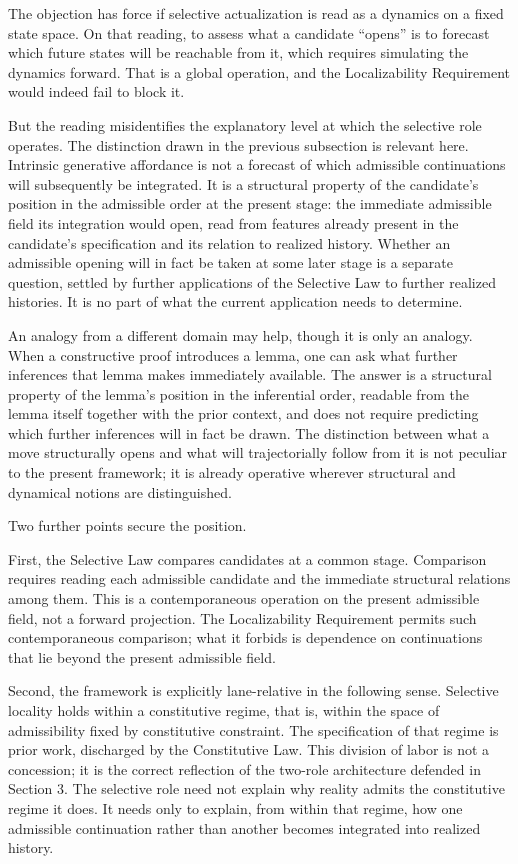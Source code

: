 \documentclass[11pt]{article}
\theoremstyle{foundation}
\begin{document}
The objection has force if selective actualization is read as a dynamics on a fixed state space. On that reading, to assess what a candidate ``opens'' is to forecast which future states will be reachable from it, which requires simulating the dynamics forward. That is a global operation, and the Localizability Requirement would indeed fail to block it.

But the reading misidentifies the explanatory level at which the selective role operates. The distinction drawn in the previous subsection is relevant here. Intrinsic generative affordance is not a forecast of which admissible continuations will subsequently be integrated. It is a structural property of the candidate's position in the admissible order at the present stage: the immediate admissible field its integration would open, read from features already present in the candidate's specification and its relation to realized history. Whether an admissible opening will in fact be taken at some later stage is a separate question, settled by further applications of the Selective Law to further realized histories. It is no part of what the current application needs to determine.

An analogy from a different domain may help, though it is only an analogy. When a constructive proof introduces a lemma, one can ask what further inferences that lemma makes immediately available. The answer is a structural property of the lemma's position in the inferential order, readable from the lemma itself together with the prior context, and does not require predicting which further inferences will in fact be drawn. The distinction between what a move structurally opens and what will trajectorially follow from it is not peculiar to the present framework; it is already operative wherever structural and dynamical notions are distinguished.

Two further points secure the position.

First, the Selective Law compares candidates at a common stage. Comparison requires reading each admissible candidate and the immediate structural relations among them. This is a contemporaneous operation on the present admissible field, not a forward projection. The Localizability Requirement permits such contemporaneous comparison; what it forbids is dependence on continuations that lie beyond the present admissible field.

Second, the framework is explicitly lane-relative in the following sense. Selective locality holds within a constitutive regime, that is, within the space of admissibility fixed by constitutive constraint. The specification of that regime is prior work, discharged by the Constitutive Law. This division of labor is not a concession; it is the correct reflection of the two-role architecture defended in Section 3. The selective role need not explain why reality admits the constitutive regime it does. It needs only to explain, from within that regime, how one admissible continuation rather than another becomes integrated into realized history.
\end{document}
